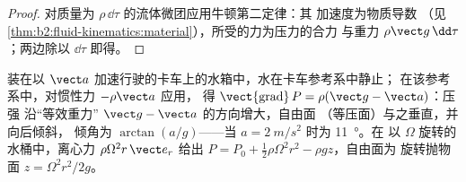 \begin{proof}
对质量为 $\rho\,\dd\tau$ 的流体微团应用牛顿第二定律：其
加速度为物质导数
（见\cref{thm:b2:fluid-kinematics:material}），所受的力为压力的合力
与重力 $\rho\vect g\,\dd\tau$；两边除以 $\dd\tau$ 即得。
\end{proof}

\begin{example}[加速运动的水箱]\label{ex:b2:euler-bernoulli:tank}
装在以 $\vect a$ 加速行驶的卡车上的水箱中，水在卡车参考系中静止；
在该参考系中，对惯性力 $-\rho\vect a$ 应用，
得 $\operatorname{\vect{grad}}P = \rho(\vect g - \vect a)$：压强
沿“等效重力” $\vect g - \vect a$ 的方向增大，自由面
（等压面）与之垂直，并向后倾斜，
倾角为 $\arctan(a/g)$——当 $a = \qty{2}{m/s^2}$ 时为 \qty{11}{\degree}。在
以 $\Omega$ 旋转的水桶中，离心力 $\rho\Omega^2r\,\vect e_r$
给出 $P = P_0 + \tfrac12\rho\Omega^2r^2 - \rho gz$，自由面为
旋转抛物面 $z = \Omega^2r^2/2g$。
\end{example}

